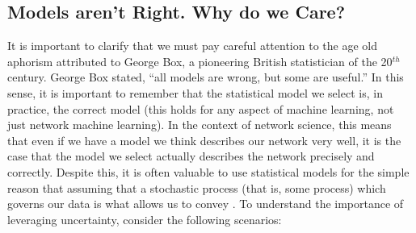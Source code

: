 \documentclass[letterpaper,10pt,english]{jupyterBook}
\begin{document}
\subsection{Models aren’t Right. Why do we Care?}
\label{\detokenize{representations/ch5/why-use-models:models-aren-t-right-why-do-we-care}}
\sphinxAtStartPar
It is important to clarify that we must pay careful attention to the age old aphorism attributed to George Box, a pioneering British statistician of the 20\(^{th}\) century. George Box stated, “all models are wrong, but some are useful.” In this sense, it is important to remember that the statistical model we select is, in practice,  the correct model (this holds for any aspect of machine learning, not just network machine learning). In the context of network science, this means that even if we have a model we think describes our network very well, it is  the case that the model we select actually describes the network precisely and correctly. Despite this, it is often valuable to use statistical models for the simple reason that assuming that a stochastic process (that is, some  process) which governs our data is what allows us to convey . To understand the importance of leveraging uncertainty, consider the following scenarios:
\end{document}

